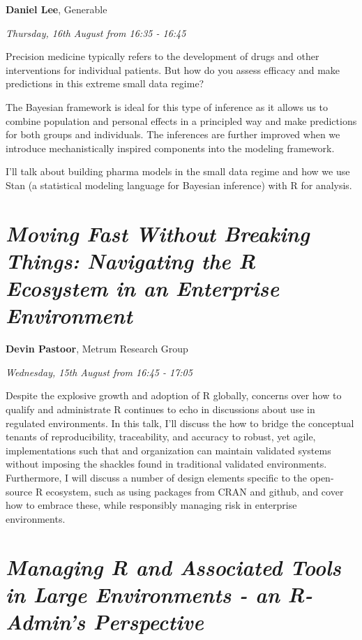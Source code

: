 \documentclass[]{book}
\theoremstyle{definition}
\theoremstyle{definition}
\theoremstyle{definition}
\theoremstyle{remark}
\begin{document}
\textbf{Daniel Lee}, Generable

\emph{Thursday, 16th August from 16:35 - 16:45}

Precision medicine typically refers to the development of drugs and
other interventions for individual patients. But how do you assess
efficacy and make predictions in this extreme small data regime?

The Bayesian framework is ideal for this type of inference as it allows
us to combine population and personal effects in a principled way and
make predictions for both groups and individuals. The inferences are
further improved when we introduce mechanistically inspired components
into the modeling framework.

I'll talk about building pharma models in the small data regime and how
we use Stan (a statistical modeling language for Bayesian inference)
with R for analysis.

\hypertarget{moving-fast-without-breaking-things-navigating-the-r-ecosystem-in-an-enterprise-environment}{%
\section{\texorpdfstring{\emph{Moving Fast Without Breaking Things:
Navigating the R Ecosystem in an Enterprise
Environment}}{Moving Fast Without Breaking Things: Navigating the R Ecosystem in an Enterprise Environment}}\label{moving-fast-without-breaking-things-navigating-the-r-ecosystem-in-an-enterprise-environment}}

\textbf{Devin Pastoor}, Metrum Research Group

\emph{Wednesday, 15th August from 16:45 - 17:05}

Despite the explosive growth and adoption of R globally, concerns over
how to qualify and administrate R continues to echo in discussions about
use in regulated environments. In this talk, I'll discuss the how to
bridge the conceptual tenants of reproducibility, traceability, and
accuracy to robust, yet agile, implementations such that and
organization can maintain validated systems without imposing the
shackles found in traditional validated environments. Furthermore, I
will discuss a number of design elements specific to the open-source R
ecosystem, such as using packages from CRAN and github, and cover how to
embrace these, while responsibly managing risk in enterprise
environments.

\hypertarget{managing-r-and-associated-tools-in-large-environments---an-r-admins-perspective}{%
\section{\texorpdfstring{\emph{Managing R and Associated Tools in Large
Environments - an R-Admin's
Perspective}}{Managing R and Associated Tools in Large Environments - an R-Admin's Perspective}}\label{managing-r-and-associated-tools-in-large-environments---an-r-admins-perspective}}
\end{document}
